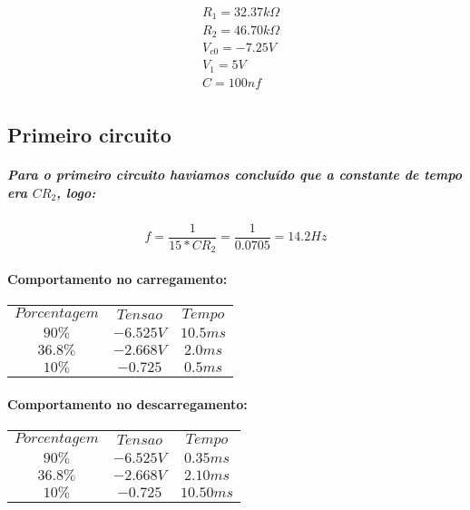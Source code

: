 \documentclass[12pt,twoside, a4paper, twocolumn]{article}
\begin{document}
\begin{equation*}
    \begin{aligned}
         & R_1 = 32.37 k\varOmega \\
         & R_2 = 46.70 k\varOmega \\
         & V_{c0} = -7.25 V       \\
         & V_1 = 5 V              \\
         & C = 100nf              \\
    \end{aligned}
\end{equation*}

\subsection{Primeiro circuito}

\subparagraph*{Para o primeiro circuito haviamos concluído que a constante de tempo era $C R_2$, logo:}

\begin{equation}
    f = \frac{1}{15*C R_2} = \frac{1}{ 0.0705} = 14.2 Hz
\end{equation}


\paragraph*{Comportamento no carregamento:}
\begin{center}
    \begin{tabular}{ |ccc| }
        \hline
        $Porcentagem$ & $Tensao$  & $Tempo$  \\
        $90\%$        & $-6.525V$ & $10.5ms$ \\
        $36.8\%$      & $-2.668V$ & $2.0ms$  \\
        $10\%$        & $-0.725$  & $0.5ms$  \\
        \hline
    \end{tabular}
\end{center}

\paragraph*{Comportamento no descarregamento:}
\begin{center}
    \begin{tabular}{ |ccc| }
        \hline
        $Porcentagem$ & $Tensao$  & $Tempo$   \\
        $90\%$        & $-6.525V$ & $0.35ms$  \\
        $36.8\%$      & $-2.668V$ & $2.10ms$  \\
        $10\%$        & $-0.725$  & $10.50ms$ \\
        \hline
    \end{tabular}
\end{center}
\end{document}

